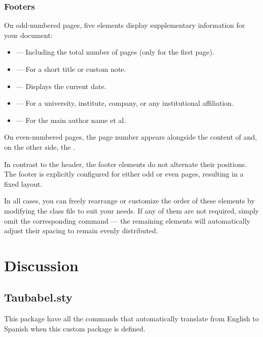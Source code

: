 \documentclass[9pt,a4paper,twocolumn,twoside]{tau-class/tau}
\begin{document}
        \subsubsection{Footers}

            On odd-numbered pages, five elements display supplementary information for your document:
    
            \begin{itemize}
                \item \inlinecode{\thepage} — Including the total number of pages (only for the first page).
                \item \inlinecode{\footinfo{}} — For a short title or custom note.
                \item \inlinecode{\theday{}} — Displays the current date.
                \item \inlinecode{\organization{}} — For a university, institute, company, or any institutional affiliation.
                \item \inlinecode{\leadauthor{}} — For the main author name et al.
            \end{itemize}

            On even-numbered pages, the page number appears alongside the content of \inlinecode{\footinfo{}} and, on the other side, the \inlinecode{\leadauthor{}}. 

            In contrast to the header, the footer elements do not alternate their positions. The footer is explicitly configured for either odd or even pages, resulting in a fixed layout.
            
            In all cases, you can freely rearrange or customize the order of these elements by modifying the class file to suit your needs. If any of them are not required, simply omit the corresponding command — the remaining elements will automatically adjust their spacing to remain evenly distributed.

\section{Discussion}

    \subsection{Taubabel.sty}
		
		This package have all the commands that automatically translate from English to Spanish when this custom package is defined. 
		
\end{document}
